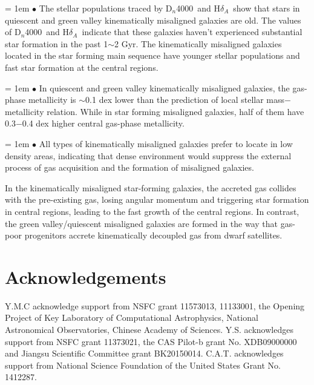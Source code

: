 \documentclass[a4paper,fleqn,usenatbib]{mnras}
\newcommand{\dindex}{D$_n$4000}
\newcommand{\hd}{H$\delta$}
\newcommand{\hda}{\hd$_A$}
\begin{document}
\hangindent = 1em
\noindent$\bullet$ The stellar populations traced by \dindex\ and \hda\ show that stars in 
quiescent and green valley kinematically misaligned galaxies are old. The values of \dindex\ and \hda\ 
indicate that these galaxies haven't experienced substantial star formation in the past 1$\sim$2 Gyr. 
The kinematically misaligned galaxies located in the star forming main sequence have younger 
stellar populations and fast star formation at the central regions.

\hangindent = 1em
\noindent$\bullet$ In quiescent and green valley kinematically misaligned galaxies, the gas-phase 
metallicity is $\sim$0.1 dex lower than the prediction of local stellar mass$-$metallicity relation. While in star forming 
misaligned galaxies, half of them have 0.3$-$0.4 dex higher central gas-phase metallicity.

\hangindent = 1em
\noindent$\bullet$ All types of kinematically misaligned galaxies prefer to 
locate in low density areas, indicating that dense environment would suppress the external process of gas acquisition 
and the formation of misaligned galaxies.

In the kinematically misaligned star-forming galaxies, the 
accreted gas collides with the pre-existing gas, losing angular momentum and triggering star formation in 
central regions, leading to the fast growth of the central regions. 
In contrast, the green valley/quiescent misaligned 
galaxies are formed in the way that gas-poor progenitors accrete kinematically decoupled gas from dwarf satellites. 

\section*{Acknowledgements}

Y.M.C acknowledge support from NSFC grant 11573013, 11133001, the Opening Project of Key Laboratory of Computational Astrophysics, National Astronomical Observatories, Chinese Academy of Sciences. Y.S. acknowledges support from NSFC grant 11373021, the CAS Pilot-b grant No. XDB09000000 and Jiangsu Scientific Committee grant BK20150014. C.A.T. acknowledges support from National Science Foundation of the United States Grant No. 1412287.
\end{document}
